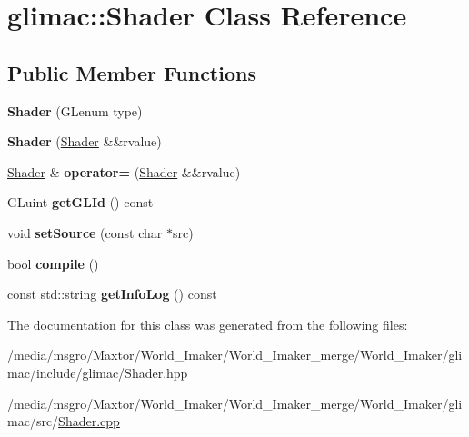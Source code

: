 \hypertarget{classglimac_1_1Shader}{}\section{glimac\+:\+:Shader Class Reference}
\label{classglimac_1_1Shader}
\subsection*{Public Member Functions}
\begin{DoxyCompactItemize}
\item 
\mbox{\label{classglimac_1_1Shader_a064a1d24851c1c405d3c912cff9521c4}} 
{\bfseries Shader} (G\+Lenum type)
\item 
\mbox{\label{classglimac_1_1Shader_a98bf794b782f89a7a5c859607e6dc62b}} 
{\bfseries Shader} (\hyperlink{classglimac_1_1Shader}{Shader} \&\&rvalue)
\item 
\mbox{\label{classglimac_1_1Shader_a0790eeb7a9fc154161bee6b78e287828}} 
\hyperlink{classglimac_1_1Shader}{Shader} \& {\bfseries operator=} (\hyperlink{classglimac_1_1Shader}{Shader} \&\&rvalue)
\item 
\mbox{\label{classglimac_1_1Shader_a46c21c4b6b9ee89426b458695897202e}} 
G\+Luint {\bfseries get\+G\+L\+Id} () const
\item 
\mbox{\label{classglimac_1_1Shader_a66701118e7f1d789a258936c82b32874}} 
void {\bfseries set\+Source} (const char $\ast$src)
\item 
\mbox{\label{classglimac_1_1Shader_a1e6c6814a6275dd698b3befdb89aa647}} 
bool {\bfseries compile} ()
\item 
\mbox{\label{classglimac_1_1Shader_aa0de6702041087187d8eca874000cfa6}} 
const std\+::string {\bfseries get\+Info\+Log} () const
\end{DoxyCompactItemize}


The documentation for this class was generated from the following files\+:\begin{DoxyCompactItemize}
\item 
/media/msgro/\+Maxtor/\+World\+\_\+\+Imaker/\+World\+\_\+\+Imaker\+\_\+merge/\+World\+\_\+\+Imaker/glimac/include/glimac/Shader.\+hpp\item 
/media/msgro/\+Maxtor/\+World\+\_\+\+Imaker/\+World\+\_\+\+Imaker\+\_\+merge/\+World\+\_\+\+Imaker/glimac/src/\hyperlink{Shader_8cpp}{Shader.\+cpp}\end{DoxyCompactItemize}
